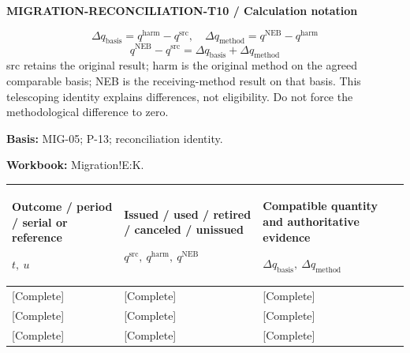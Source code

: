 \par\begingroup\sffamily\fontsize{8}{10}\selectfont\color{NEBGreen}\setlength{\parskip}{2pt}\setlength{\abovedisplayskip}{4pt}\setlength{\belowdisplayskip}{4pt}\setlength{\abovedisplayshortskip}{2pt}\setlength{\belowdisplayshortskip}{3pt}
\textbf{MIGRATION-RECONCILIATION-T10 / Calculation notation}\par
{\fontsize{9}{11}\selectfont\[ \Delta q_{\mathrm{basis}}=q^{\mathrm{harm}}-q^{\mathrm{src}},\quad \Delta q_{\mathrm{method}}=q^{\mathrm{NEB}}-q^{\mathrm{harm}} \]}
{\fontsize{9}{11}\selectfont\[ q^{\mathrm{NEB}}-q^{\mathrm{src}}=\Delta q_{\mathrm{basis}}+\Delta q_{\mathrm{method}} \]}
src retains the original result; harm is the original method on the agreed comparable basis; NEB is the receiving-method result on that basis. This telescoping identity explains differences, not eligibility. Do not force the methodological difference to zero.\par
\textbf{Basis:} MIG-05; P-13; reconciliation identity.\par
\textbf{Workbook:} Migration!E:K.\par\endgroup
{\sffamily\fontsize{8.3}{10.3}\selectfont\begin{longtable}{@{}P{54.83mm} P{54.83mm} P{54.83mm}@{}}
\toprule
\textbf{Outcome / period / serial or reference}\par {\normalfont\fontsize{8.2}{10}\selectfont $t,\ u$} & \textbf{Issued / used / retired / canceled / unissued}\par {\normalfont\fontsize{8.2}{10}\selectfont $q^{\mathrm{src}},\ q^{\mathrm{harm}},\ q^{\mathrm{NEB}}$} & \textbf{Compatible quantity and authoritative evidence}\par {\normalfont\fontsize{8.2}{10}\selectfont $\Delta q_{\mathrm{basis}},\ \Delta q_{\mathrm{method}}$}\\\midrule\endhead
\rule{0pt}{8mm}[Complete] & [Complete] & [Complete]\\\hline
\rule{0pt}{8mm}[Complete] & [Complete] & [Complete]\\\hline
\rule{0pt}{8mm}[Complete] & [Complete] & [Complete]\\\hline
\end{longtable}}
\par\begingroup\sffamily\fontsize{8}{10}\selectfont\color{NEBGreen}\setlength{\parskip}{2pt}\setlength{\abovedisplayskip}{4pt}\setlength{\belowdisplayskip}{4pt}\setlength{\abovedisplayshortskip}{2pt}\setlength{\belowdisplayshortskip}{3pt}
